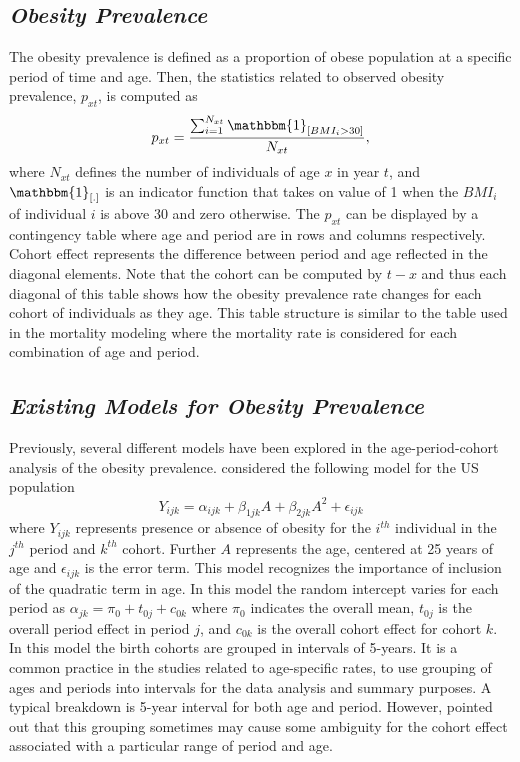 \documentclass[11pt,letterpaper]{article}
\numberwithin{equation}{section}
\begin{document}
\subsection{\textit{Obesity Prevalence}}
The obesity prevalence is defined as a proportion of obese population at a specific period of time and age. Then, the statistics related to observed obesity prevalence, $p_{xt}$, is computed as
\begin{equation}\label{eq:a1}
p_{xt}=\frac{\sum_{i=1}^{N_{xt}}{\mathbbm{1}_{[BMI_{i}>30]}}}{N_{xt}},
\end{equation}
where $N_{xt}$ defines the number of individuals of  age $x$ in year $t$, and ${\mathbbm{1}_{[.]}}$ is an indicator function that takes on value of 1 when the $BMI_{i}$ of individual $i$ is above 30 and zero otherwise. The $p_{xt}$ can be displayed by a contingency table where age and period are in rows and columns respectively. Cohort effect represents the difference between period and age reflected in the diagonal elements. Note that the cohort can be computed by $t-x$ and thus each diagonal of this table shows how the obesity prevalence rate changes for each cohort of individuals as they age. This table structure is similar to the table used in the mortality modeling where the mortality rate is considered for each combination of age and period.


\subsection{\textit{Existing Models for Obesity Prevalence}}

Previously, several different models have been explored in the age-period-cohort analysis of the obesity prevalence. \cite{Reither+Hauser+Yang:2009} considered the following model for the US population
\begin{equation}\label{eq:p1}
Y_{ijk}=\alpha_{ijk} + \beta_{1jk}A + \beta_{2jk}A^{2} + \epsilon_{ijk}
\end{equation}
where $Y_{ijk}$ represents presence or absence of obesity for the $i^{th}$ individual in the $j^{th}$ period and $k^{th}$ cohort. Further $A$ represents the age, centered at 25 years of age and $\epsilon_{ijk}$ is the error term. This model recognizes the importance of inclusion of the quadratic term in age. In this model the random intercept varies for each period as $\alpha_{jk}= \pi_0 + t_{0j} + c_{0k}$ where $\pi_0$ indicates the overall mean, $t_{0j}$ is the overall period effect in period $j$, and $c_{0k}$ is the overall cohort effect for cohort $k$. In this model the birth cohorts are grouped in intervals of 5-years. It is a common practice in the studies related to age-specific rates, to use grouping of ages and periods into intervals for the data analysis and summary purposes. A typical breakdown is 5-year interval for both age and period. However, \cite{Holford:1991} pointed out that this grouping sometimes may cause some ambiguity for the cohort effect associated with a particular range of period and age.
\end{document}
